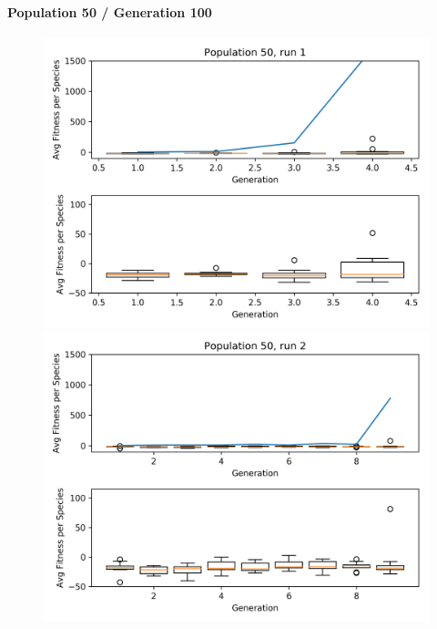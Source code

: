 		\paragraph{Population 50 / Generation 100}
			\begin{figure}[h]
				\centering
				\begin{minipage}{0.33\textwidth}
					\centering
					\includegraphics[width=1\textwidth]{graphics/flappy/pop50_run1} %
				\end{minipage}\hfill
				\begin{minipage}{0.33\textwidth}
					\centering
					\includegraphics[width=1\textwidth]{graphics/flappy/pop50_run2} %
				\end{minipage}

\end{figure}
